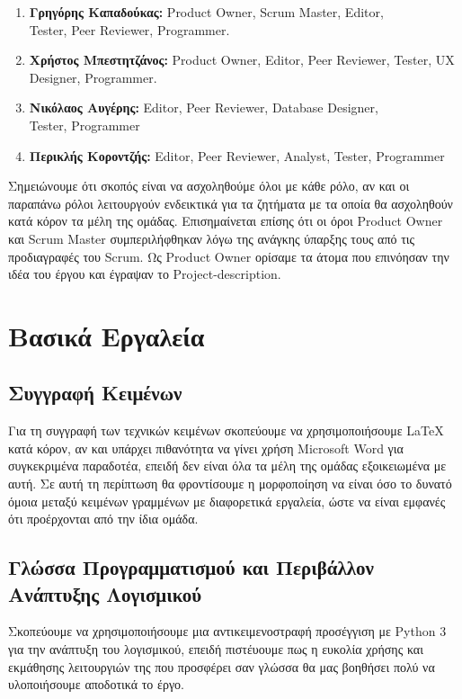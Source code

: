 \documentclass[12pt,a4paper]{article}
\begin{document}
\begin{enumerate}
	\item \textbf{Γρηγόρης Καπαδούκας:} Product Owner, Scrum Master, Editor,\\ Tester, Peer Reviewer, Programmer.
	\item \textbf{Χρήστος Μπεστητζάνος:} Product Owner, Editor, Peer Reviewer, Tester, UX Designer, Programmer.
	\item \textbf{Νικόλαος Αυγέρης:} Editor, Peer Reviewer, Database Designer,\\ Tester, Programmer
	\item \textbf{Περικλής Κοροντζής:} Editor, Peer Reviewer, Analyst, Tester, Programmer
\end{enumerate}

Σημειώνουμε ότι σκοπός είναι να ασχοληθούμε όλοι με κάθε ρόλο, αν και οι παραπάνω ρόλοι λειτουργούν ενδεικτικά για τα ζητήματα με τα οποία θα ασχοληθούν κατά κόρον τα μέλη της ομάδας. Επισημαίνεται επίσης ότι οι όροι Product Owner και Scrum Master συμπεριλήφθηκαν λόγω της ανάγκης ύπαρξης τους από τις προδιαγραφές του Scrum. Ως Product Owner ορίσαμε τα άτομα που επινόησαν την ιδέα του έργου και έγραψαν το Project-description.

\section{Βασικά Εργαλεία}

\subsection{Συγγραφή Κειμένων}
Για τη συγγραφή των τεχνικών κειμένων σκοπεύουμε να χρησιμοποιήσουμε LaTeX κατά κόρον, αν και υπάρχει πιθανότητα να γίνει χρήση Microsoft Word για συγκεκριμένα παραδοτέα, επειδή δεν είναι όλα τα μέλη της ομάδας εξοικειωμένα με αυτή. Σε αυτή τη περίπτωση θα φροντίσουμε η μορφοποίηση να είναι όσο το δυνατό όμοια μεταξύ κειμένων γραμμένων με διαφορετικά εργαλεία, ώστε να είναι εμφανές ότι προέρχονται από την ίδια ομάδα.

\subsection{Γλώσσα Προγραμματισμού και Περιβάλλον Ανάπτυξης Λογισμικού}
Σκοπεύουμε να χρησιμοποιήσουμε μια αντικειμενοστραφή προσέγγιση με Python 3 για την ανάπτυξη του λογισμικού, επειδή πιστέυουμε πως η ευκολία χρήσης και εκμάθησης λειτουργιών της που προσφέρει σαν γλώσσα θα μας βοηθήσει πολύ να υλοποιήσουμε αποδοτικά το έργο.
\end{document}
